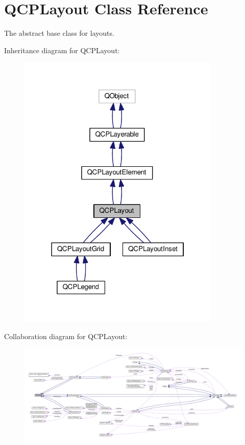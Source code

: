 \hypertarget{class_q_c_p_layout}{}\section{Q\+C\+P\+Layout Class Reference}
\label{class_q_c_p_layout}


The abstract base class for layouts.  




Inheritance diagram for Q\+C\+P\+Layout\+:\nopagebreak
\begin{figure}[H]
\begin{center}
\leavevmode
\includegraphics[width=273pt]{class_q_c_p_layout__inherit__graph}
\end{center}
\end{figure}


Collaboration diagram for Q\+C\+P\+Layout\+:\nopagebreak
\begin{figure}[H]
\begin{center}
\leavevmode
\includegraphics[width=350pt]{class_q_c_p_layout__coll__graph}
\end{center}
\end{figure}
